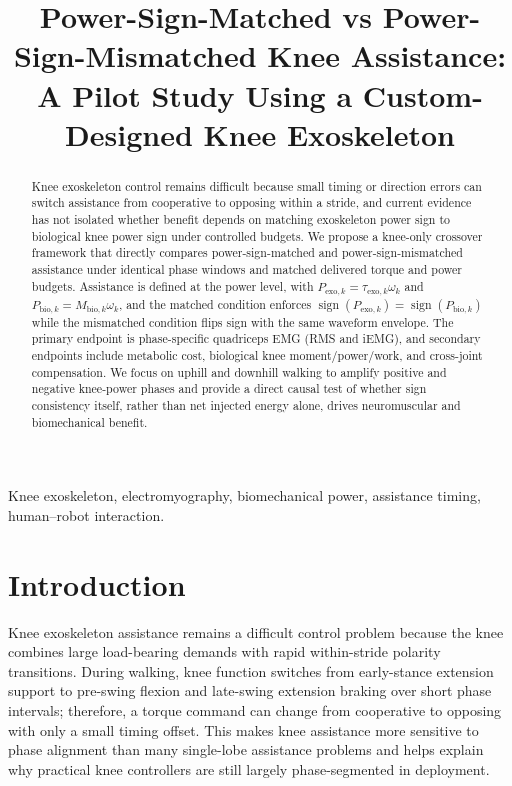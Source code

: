 \documentclass[lettersize,journal]{IEEEtran}
\begin{document}
\title{Power-Sign-Matched vs Power-Sign-Mismatched Knee Assistance: A Pilot Study Using a Custom-Designed Knee Exoskeleton}


\maketitle

\begin{abstract}
Knee exoskeleton control remains difficult because small timing or direction errors can switch assistance from cooperative to opposing within a stride, and current evidence has not isolated whether benefit depends on matching exoskeleton power sign to biological knee power sign under controlled budgets. We propose a knee-only crossover framework that directly compares power-sign-matched and power-sign-mismatched assistance under identical phase windows and matched delivered torque and power budgets. Assistance is defined at the power level, with $P_{\mathrm{exo},k}=\tau_{\mathrm{exo},k}\omega_k$ and $P_{\mathrm{bio},k}=M_{\mathrm{bio},k}\omega_k$, and the matched condition enforces $\operatorname{sign}(P_{\mathrm{exo},k})=\operatorname{sign}(P_{\mathrm{bio},k})$ while the mismatched condition flips sign with the same waveform envelope. The primary endpoint is phase-specific quadriceps EMG (RMS and iEMG), and secondary endpoints include metabolic cost, biological knee moment/power/work, and cross-joint compensation. We focus on uphill and downhill walking to amplify positive and negative knee-power phases and provide a direct causal test of whether sign consistency itself, rather than net injected energy alone, drives neuromuscular and biomechanical benefit.
\end{abstract}

\begin{IEEEkeywords}
Knee exoskeleton, electromyography, biomechanical power, assistance timing, human--robot interaction.
\end{IEEEkeywords}

\section{Introduction}
Knee exoskeleton assistance remains a difficult control problem because the knee combines large load-bearing demands with rapid within-stride polarity transitions. During walking, knee function switches from early-stance extension support to pre-swing flexion and late-swing extension braking over short phase intervals; therefore, a torque command can change from cooperative to opposing with only a small timing offset. This makes knee assistance more sensitive to phase alignment than many single-lobe assistance problems and helps explain why practical knee controllers are still largely phase-segmented in deployment.
\end{document}
